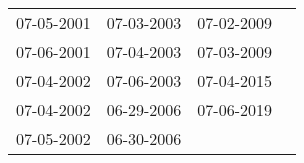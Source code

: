 \begin{supertabular}{llll}
 07-05-2001 &  07-03-2003 &  07-02-2009 \\
 07-06-2001 &  07-04-2003 &  07-03-2009 \\
 07-04-2002 &  07-06-2003 &  07-04-2015 \\
 07-04-2002 &  06-29-2006 &  07-06-2019 \\
 07-05-2002 &  06-30-2006 &             \\
\end{supertabular}
